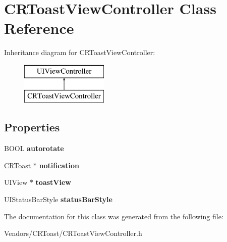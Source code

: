 \hypertarget{interface_c_r_toast_view_controller}{}\section{C\+R\+Toast\+View\+Controller Class Reference}
\label{interface_c_r_toast_view_controller}
Inheritance diagram for C\+R\+Toast\+View\+Controller\+:\begin{figure}[H]
\begin{center}
\leavevmode
\includegraphics[height=2.000000cm]{interface_c_r_toast_view_controller}
\end{center}
\end{figure}
\subsection*{Properties}
\begin{DoxyCompactItemize}
\item 
\hypertarget{interface_c_r_toast_view_controller_ac6331b96781eb198c006dd5579012866}{}B\+O\+O\+L {\bfseries autorotate}\label{interface_c_r_toast_view_controller_ac6331b96781eb198c006dd5579012866}

\item 
\hypertarget{interface_c_r_toast_view_controller_a1a0b5c82b78bfb6959c15872cb895f87}{}\hyperlink{interface_c_r_toast}{C\+R\+Toast} $\ast$ {\bfseries notification}\label{interface_c_r_toast_view_controller_a1a0b5c82b78bfb6959c15872cb895f87}

\item 
\hypertarget{interface_c_r_toast_view_controller_acc87a46a9d1e7095c88c58a9f4c35669}{}U\+I\+View $\ast$ {\bfseries toast\+View}\label{interface_c_r_toast_view_controller_acc87a46a9d1e7095c88c58a9f4c35669}

\item 
\hypertarget{interface_c_r_toast_view_controller_af686074b44b147c456cfb7caa77462e9}{}U\+I\+Status\+Bar\+Style {\bfseries status\+Bar\+Style}\label{interface_c_r_toast_view_controller_af686074b44b147c456cfb7caa77462e9}

\end{DoxyCompactItemize}


The documentation for this class was generated from the following file\+:\begin{DoxyCompactItemize}
\item 
Vendors/\+C\+R\+Toast/C\+R\+Toast\+View\+Controller.\+h\end{DoxyCompactItemize}
